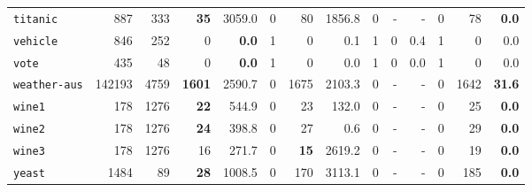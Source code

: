 \begin{tabular}{lccrrrrrrrrrrr}
\texttt{titanic} & \multicolumn{1}{r}{887} & \multicolumn{1}{r}{333}  & \textbf{35} & 3059.0 & 0 & 80 & 1856.8 & 0 & - & - & 0 & 78 & \textbf{0.0}\\
\texttt{vehicle} & \multicolumn{1}{r}{846} & \multicolumn{1}{r}{252}  & 0 & \textbf{0.0} & 1 & 0 & 0.1 & 1 & 0 & 0.4 & 1 & 0 & 0.0\\
\texttt{vote} & \multicolumn{1}{r}{435} & \multicolumn{1}{r}{48}  & 0 & \textbf{0.0} & 1 & 0 & 0.0 & 1 & 0 & 0.0 & 1 & 0 & 0.0\\
\texttt{weather-aus} & \multicolumn{1}{r}{142193} & \multicolumn{1}{r}{4759}  & \textbf{1601} & 2590.7 & 0 & 1675 & 2103.3 & 0 & - & - & 0 & 1642 & \textbf{31.6}\\
\texttt{wine1} & \multicolumn{1}{r}{178} & \multicolumn{1}{r}{1276}  & \textbf{22} & 544.9 & 0 & 23 & 132.0 & 0 & - & - & 0 & 25 & \textbf{0.0}\\
\texttt{wine2} & \multicolumn{1}{r}{178} & \multicolumn{1}{r}{1276}  & \textbf{24} & 398.8 & 0 & 27 & 0.6 & 0 & - & - & 0 & 29 & \textbf{0.0}\\
\texttt{wine3} & \multicolumn{1}{r}{178} & \multicolumn{1}{r}{1276}  & 16 & 271.7 & 0 & \textbf{15} & 2619.2 & 0 & - & - & 0 & 19 & \textbf{0.0}\\
\texttt{yeast} & \multicolumn{1}{r}{1484} & \multicolumn{1}{r}{89}  & \textbf{28} & 1008.5 & 0 & 170 & 3113.1 & 0 & - & - & 0 & 185 & \textbf{0.0}\\
\bottomrule
\end{tabular}
